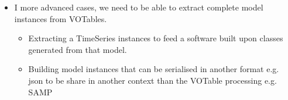 \begin{itemize}
  \item I more advanced cases, we need to be able to extract complete model instances from VOTables.
    \begin{itemize}
      \item Extracting a TimeSeries instances to feed a software built upon classes generated from that model.
      \item Building model instances that can be serialised in another format e.g. json to be share in another context than the VOTable processing e.g. SAMP
   \end{itemize}          
    
\end{itemize} 

